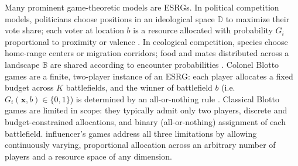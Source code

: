 \documentclass{article}
\newcommand {\D}{\mathbb{D}}
\newcommand {\B}{\mathbb{B}}
\begin{document}
            Many prominent game-theoretic models are ESRGs. In political competition models, politicians choose positions in an ideological space $\D$ to maximize their vote share; each voter at location $b$ is a resource allocated with probability $G_i$ proportional to proximity or valence \cite{yang2020us}. In ecological competition, species choose home-range centers or migration corridors; food and mates distributed across a landscape $\B$ are shared according to encounter probabilities \cite{borger2008effects}. Colonel Blotto games are a finite, two-player instance of an ESRG: each player allocates a fixed budget across $K$ battlefields, and the winner of battlefield $b$ (i.e.~$G_i(\mathbf{x},b) \in \{0,1\}$) is determined by an all-or-nothing rule \cite{kovenock2012colonel,roberson2006colonel}. Classical Blotto games are limited in scope: they typically admit only two players, discrete and budget-constrained allocations, and binary (all-or-nothing) assignment of each battlefield. influencer's games address all three limitations by allowing continuously varying, proportional allocation across an arbitrary number of players and a resource space of any dimension. 
\end{document}
